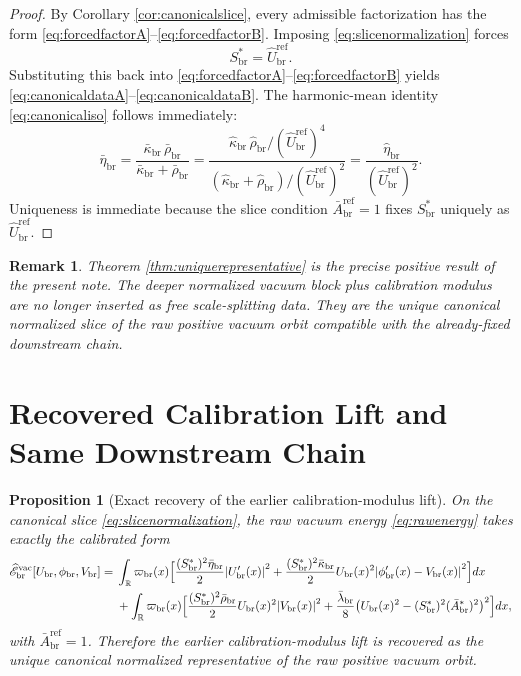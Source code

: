 \documentclass[11pt]{article}
\newcommand{\ProfWeight}{\varpi_{\mathrm{br}}}
\newcommand{\RespVacAmp}{U_{\mathrm{br}}}
\newcommand{\RespVacPhase}{\phi_{\mathrm{br}}}
\newcommand{\RespVacCarrier}{V_{\mathrm{br}}}
\newcommand{\RespScaleEq}{S_{\mathrm{br}}^{\ast}}
\newcommand{\RespScaleAmpRef}{\bar A_{\mathrm{br}}^{\mathrm{ref}}}
\newcommand{\RespScaleCov}{\bar\kappa_{\mathrm{br}}}
\newcommand{\RespScaleRelax}{\bar\rho_{\mathrm{br}}}
\newcommand{\RespScaleWell}{\bar\lambda_{\mathrm{br}}}
\newcommand{\RespScaleAmpEq}{\bar A_{\mathrm{br}}^{\ast}}
\newcommand{\RespScaleIso}{\bar\eta_{\mathrm{br}}}
\newcommand{\RespRawRef}{\widehat U_{\mathrm{br}}^{\mathrm{ref}}}
\newcommand{\RespRawCov}{\widehat\kappa_{\mathrm{br}}}
\newcommand{\RespRawRelax}{\widehat\rho_{\mathrm{br}}}
\newcommand{\RespRawIso}{\widehat\eta_{\mathrm{br}}}
\newcommand{\RespRawEnergy}{\widehat{\mathscr E}_{\mathrm{br}}^{\mathrm{vac}}}
\newtheorem{proposition}{Proposition}
\newtheorem{remark}{Remark}
\begin{document}
\begin{proof}
By Corollary \ref{cor:canonicalslice}, every admissible factorization has the form \eqref{eq:forcedfactorA}--\eqref{eq:forcedfactorB}. Imposing \eqref{eq:slicenormalization} forces
\[
\RespScaleEq=\RespRawRef.
\]
Substituting this back into \eqref{eq:forcedfactorA}--\eqref{eq:forcedfactorB} yields \eqref{eq:canonicaldataA}--\eqref{eq:canonicaldataB}. The harmonic-mean identity \eqref{eq:canonicaliso} follows immediately:
\[
\RespScaleIso
=
\frac{\RespScaleCov\,\RespScaleRelax}{\RespScaleCov+\RespScaleRelax}
=
\frac{\RespRawCov\,\RespRawRelax/(\RespRawRef)^4}
     {(\RespRawCov+\RespRawRelax)/(\RespRawRef)^2}
=
\frac{\RespRawIso}{(\RespRawRef)^2}.
\]
Uniqueness is immediate because the slice condition \(\RespScaleAmpRef=1\) fixes \(\RespScaleEq\) uniquely as \(\RespRawRef\).
\end{proof}

\begin{remark}
Theorem \ref{thm:uniquerepresentative} is the precise positive result of the present note. The deeper normalized vacuum block plus calibration modulus are no longer inserted as free scale-splitting data. They are the unique canonical normalized slice of the raw positive vacuum orbit compatible with the already-fixed downstream chain.
\end{remark}

\section{Recovered Calibration Lift and Same Downstream Chain}

\begin{proposition}[Exact recovery of the earlier calibration-modulus lift]
\label{prop:recoverlift}
On the canonical slice \eqref{eq:slicenormalization}, the raw vacuum energy \eqref{eq:rawenergy} takes exactly the calibrated form
\begin{align}
\RespRawEnergy[\RespVacAmp,\RespVacPhase,\RespVacCarrier]
=\;&
\int_{\mathbb R}\ProfWeight(x)\Bigl[
\frac{(\RespScaleEq)^2\RespScaleIso}{2}\abs{\RespVacAmp'(x)}^2
+
\frac{(\RespScaleEq)^2\RespScaleCov}{2}\RespVacAmp(x)^2\abs{\RespVacPhase'(x)-\RespVacCarrier(x)}^2
\Bigr]dx
\nonumber\\
&+
\int_{\mathbb R}\ProfWeight(x)\Bigl[
\frac{(\RespScaleEq)^2\RespScaleRelax}{2}\RespVacAmp(x)^2\abs{\RespVacCarrier(x)}^2
+
\frac{\RespScaleWell}{8}\bigl(\RespVacAmp(x)^2-(\RespScaleEq)^2(\RespScaleAmpEq)^2\bigr)^2
\Bigr]dx,
\label{eq:recoveredlift}
\end{align}
with \(\RespScaleAmpRef=1\). Therefore the earlier calibration-modulus lift is recovered as the unique canonical normalized representative of the raw positive vacuum orbit.
\end{proposition}
\end{document}
